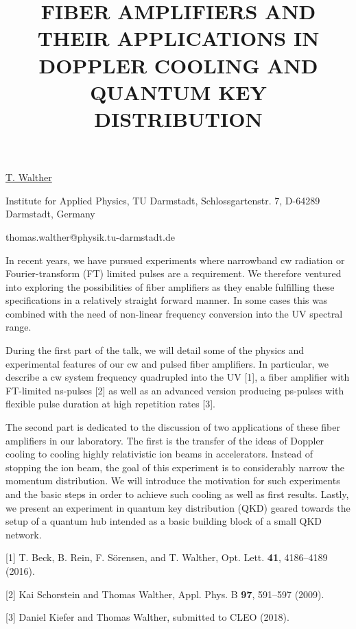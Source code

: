 \title{FIBER AMPLIFIERS AND THEIR APPLICATIONS IN DOPPLER COOLING AND QUANTUM KEY DISTRIBUTION}

\underline{T. Walther} 

{\normalsize{\vspace{-4mm}
Institute for Applied Physics,
TU Darmstadt,
Schlossgartenstr. 7,
D-64289 Darmstadt,
Germany

\email thomas.walther@physik.tu-darmstadt.de}}

In recent years, we have pursued experiments where narrowband cw radiation or Fourier-transform (FT) limited pulses are a requirement. We therefore ventured into exploring the possibilities of fiber amplifiers as they enable fulfilling these specifications in a relatively straight forward manner. In some cases this was combined with the need of non-linear frequency conversion into the UV spectral range.

During the first part of the talk, we will detail some of the physics and experimental features of our cw and pulsed fiber amplifiers. In particular, we describe a cw system frequency quadrupled into the UV [1], a fiber amplifier with FT-limited ns-pulses [2] as well as an advanced version producing ps-pulses with flexible pulse duration at high repetition rates [3].

The second part is dedicated to the discussion of two applications of these fiber amplifiers in our laboratory. The first is the transfer of the ideas of Doppler cooling to cooling highly relativistic ion beams in accelerators. Instead of stopping the ion beam, the goal of this experiment is to considerably narrow the momentum distribution. We will introduce the motivation for such experiments and the basic steps in order to achieve such cooling as well as first results.
Lastly, we present an experiment in quantum key distribution (QKD) geared towards the setup of a quantum hub intended as a basic building block of a small QKD network.

{\normalsize
[1] T. Beck, B. Rein, F. S\"orensen, and T. Walther, Opt. Lett. \textbf{41}, 4186--4189 (2016).
\vsp

[2] Kai Schorstein and Thomas Walther, Appl. Phys. B \textbf{97}, 591--597 (2009).
\vsp

[3] Daniel Kiefer and Thomas Walther, submitted to CLEO (2018).
}

\vspace{\baselineskip} 